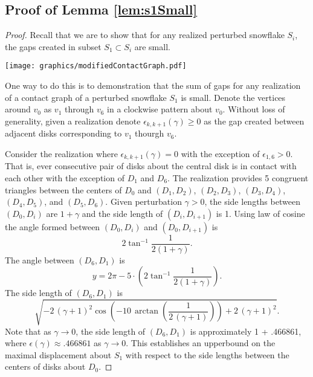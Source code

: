 \documentclass[10pt]{CSUNthesis}
\theoremstyle{plain}%
\theoremstyle{definition}
\theoremstyle{remark}
\newcommand{\lr}[1]{\left( #1 \right)}
\begin{document}
\subsection{Proof of Lemma \ref{lem:s1Small}}
\begin{proof}
Recall that we are to show that for any realized perturbed snowflake $S_i$, the gaps created in subset $S_1 \subset S_i$ are small.  

\begin{minipage}{\linewidth}
\begin{center}
\texttt{[image: graphics/modifiedContactGraph.pdf]}
\label{fig:modifiedContactGraph.pdf}
\end{center}
\end{minipage}

One way to do this is to demonstration that the sum of gaps for any realization of a contact graph of a perturbed snowflake $S_1$ is small. 
Denote the vertices around $v_0$ as $v_1$ through $v_6$ in a clockwise pattern about $v_0$. 
Without loss of generality, given a realization denote $\epsilon_{k, k+1} (\gamma)\geq 0$ as the gap created between adjacent disks corresponding to $v_1$ thourgh $v_6$.

Consider the realization where $\epsilon_{k, k+1} (\gamma) = 0$ with the exception of $\epsilon_{1,6} >0$.  
That is, ever consecutive pair of disks about the central disk is in contact with each other with the exception of $D_1$ and $D_6$.  
The realization provides 5 congruent triangles between the centers of $D_0$ and $\lr{D_1,D_2}$, $\lr{D_2,D_3}$, $\lr{D_3,D_4}$, $\lr{D_4,D_5}$, and $\lr{D_5,D_6}$.  
Given perturbation $\gamma > 0$, the side lengths between $\lr{D_0,D_i}$ are $1 +\gamma$ and the side length of $\lr{D_i, D_{i+1}}$ is 1.
Using law of cosine the angle formed between $\lr{D_0,D_i}$ and $\lr{D_0,D_{i+1}}$ is $$2 \tan^{-1} \frac{1}{2\lr{1+\gamma}}.$$  
The angle between $\lr{D_6, D_1}$ is $$y=2 \pi - 5 \cdot \lr{2 \tan^{-1} \frac{1}{2\lr{1+\gamma}}}.$$  
The side length of $\lr{D_6, D_1}$ is
$$\sqrt{-2 \, {\left(\gamma + 1\right)}^{2} \cos\left(-10 \,
\arctan\left(\frac{1}{2 \, {\left(\gamma + 1\right)}}\right)\right) + 2
\, {\left(\gamma + 1\right)}^{2}}.$$
Note that as $\gamma \rightarrow 0$, the side length of $\lr{D_6, D_1}$ is approximately 1 + .466861, where $\epsilon(\gamma) \approx .466861$ as $\gamma \rightarrow 0$.
This establishes an upperbound on the maximal displacement about $S_1$ with respect to the side lengths between the centers of disks about $D_0$.


\end{proof}
\end{document}
